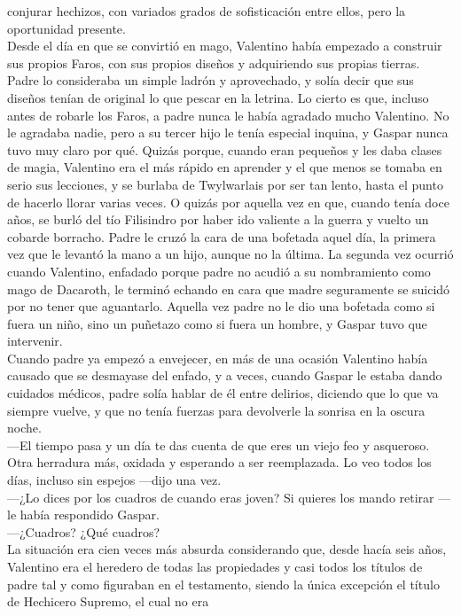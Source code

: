 \documentclass[
  letterpaper,
]{book}
\begin{document}
conjurar hechizos, con variados grados de sofisticación entre ellos,
pero la oportunidad presente.\\
Desde el día en que se convirtió en mago, Valentino había empezado a
construir sus propios Faros, con sus propios diseños y adquiriendo sus
propias tierras. Padre lo consideraba un simple ladrón y aprovechado, y
solía decir que sus diseños tenían de original lo que pescar en la
letrina. Lo cierto es que, incluso antes de robarle los Faros, a padre
nunca le había agradado mucho Valentino. No le agradaba nadie, pero a su
tercer hijo le tenía especial inquina, y Gaspar nunca tuvo muy claro por
qué. Quizás porque, cuando eran pequeños y les daba clases de magia,
Valentino era el más rápido en aprender y el que menos se tomaba en
serio sus lecciones, y se burlaba de Twylwarlais por ser tan lento,
hasta el punto de hacerlo llorar varias veces. O quizás por aquella vez
en que, cuando tenía doce años, se burló del tío Filisindro por haber
ido valiente a la guerra y vuelto un cobarde borracho. Padre le cruzó la
cara de una bofetada aquel día, la primera vez que le levantó la mano a
un hijo, aunque no la última. La segunda vez ocurrió cuando Valentino,
enfadado porque padre no acudió a su nombramiento como mago de Dacaroth,
le terminó echando en cara que madre seguramente se suicidó por no tener
que aguantarlo. Aquella vez padre no le dio una bofetada como si fuera
un niño, sino un puñetazo como si fuera un hombre, y Gaspar tuvo que
intervenir.\\
Cuando padre ya empezó a envejecer, en más de una ocasión Valentino
había causado que se desmayase del enfado, y a veces, cuando Gaspar le
estaba dando cuidados médicos, padre solía hablar de él entre delirios,
diciendo que lo que va siempre vuelve, y que no tenía fuerzas para
devolverle la sonrisa en la oscura noche.\\
---El tiempo pasa y un día te das cuenta de que eres un viejo feo y
asqueroso. Otra herradura más, oxidada y esperando a ser reemplazada. Lo
veo todos los días, incluso sin espejos ---dijo una vez.\\
---¿Lo dices por los cuadros de cuando eras joven? Si quieres los mando
retirar ---le había respondido Gaspar.\\
---¿Cuadros? ¿Qué cuadros?\\
La situación era cien veces más absurda considerando que, desde hacía
seis años, Valentino era el heredero de todas las propiedades y casi
todos los títulos de padre tal y como figuraban en el testamento, siendo
la única excepción el título de Hechicero Supremo, el cual no era
\end{document}
